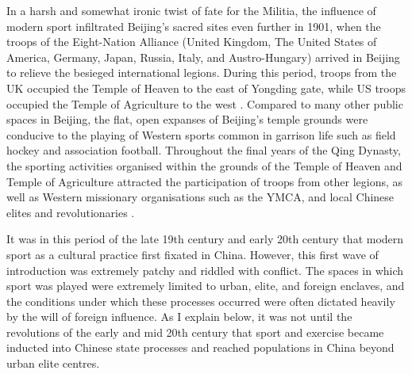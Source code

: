 \begin{CJK}{UTF8}{gbsn}
In a harsh and somewhat ironic twist of fate for the Militia, the influence of modern sport infiltrated Beijing's sacred sites even further in 1901, when the troops of the Eight-Nation Alliance (United Kingdom, The United States of America, Germany, Japan, Russia, Italy, and Austro-Hungary) arrived in Beijing to relieve the besieged international legions.  During this period, troops from the UK occupied the Temple of Heaven to the east of Yongding gate, while US troops occupied the Temple of Agriculture to the west \citep{Brownell2008}. Compared to many other public spaces in Beijing, the flat, open expanses of Beijing's temple grounds were conducive to the playing of Western sports common in garrison life such as field hockey and association football.  Throughout the final years of the Qing Dynasty, the sporting activities organised within the grounds of the Temple of Heaven and Temple of Agriculture attracted the participation of troops from other legions, as well as Western missionary organisations such as the YMCA, and local Chinese elites and revolutionaries \citep{Steel1985}.

It was in this period of the late 19th century and early 20th century that modern sport as a cultural practice first fixated in China. However, this first wave of introduction was extremely patchy and riddled with conflict.  The spaces in which sport was played were extremely limited to urban, elite, and foreign enclaves, and the conditions under which these processes occurred were often dictated heavily by the will of foreign influence.  As I explain below, it was not until the revolutions of the early and mid 20th century that sport and exercise became inducted into Chinese state processes and reached populations in China beyond urban elite centres.


\end{CJK}

